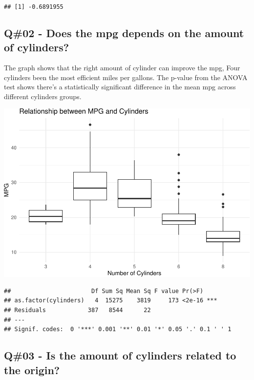 \documentclass[
]{article}
\begin{document}
\begin{verbatim}
## [1] -0.6891955
\end{verbatim}

\newpage

\hypertarget{q02---does-the-mpg-depends-on-the-amount-of-cylinders}{%
\subsection{Q\#02 - Does the mpg depends on the amount of
cylinders?}\label{q02---does-the-mpg-depends-on-the-amount-of-cylinders}}

The graph shows that the right amount of cylinder can improve the mpg,
Four cylinders been the most efficient miles per gallons. The p-value
from the ANOVA test shows there's a statistically significant difference
in the mean mpg across different cylinders groups.

\includegraphics{QuestionCar_files/figure-latex/unnamed-chunk-2-1.pdf}

\begin{verbatim}
##                       Df Sum Sq Mean Sq F value Pr(>F)    
## as.factor(cylinders)   4  15275    3819     173 <2e-16 ***
## Residuals            387   8544      22                   
## ---
## Signif. codes:  0 '***' 0.001 '**' 0.01 '*' 0.05 '.' 0.1 ' ' 1
\end{verbatim}

\newpage

\hypertarget{q03---is-the-amount-of-cylinders-related-to-the-origin}{%
\subsection{Q\#03 - Is the amount of cylinders related to the
origin?}\label{q03---is-the-amount-of-cylinders-related-to-the-origin}}
\end{document}
